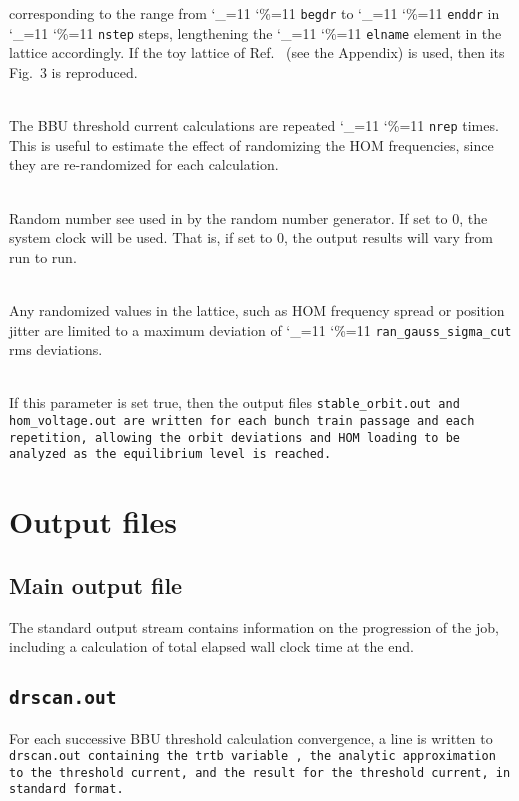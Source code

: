 \documentclass[11pt]{article}
\newcommand\ttcmd{\begingroup\catcode`\_=11 \catcode`\%=11 \dottcmd}
\newcommand\dottcmd[1]{\texttt{#1}\endgroup}
\newcommand{\vn}{\ttcmd}
\newcommand{\Newline}{\hfil \\}
\begin{document}
{\begin{description}
corresponding to the range from \vn{begdr} to \vn{enddr} in  \vn{nstep} steps,
lengthening the \vn{elname} element in the lattice accordingly. If the toy lattice
of Ref.~\cite{ref:Hoffstaetter04} (see the Appendix) is used, then its Fig.~3 is reproduced.
  \item[\vn{nrep}] \Newline
The BBU threshold current calculations are repeated \vn{nrep} times. This is useful
to estimate the effect of randomizing the HOM frequencies, since they are re-randomized for
each calculation.
  \item[\vn{ran_seed}] \Newline
Random number see used in by the random number generator. If set to 0, the system clock
will be used. That is, if set to 0, the output results will vary from run to run. 
  \item[\vn{ran_gauss_sigma_cut}] \Newline
Any randomized values in the lattice, such as HOM frequency spread or position jitter
are limited to a maximum deviation of \vn{ran_gauss_sigma_cut} rms deviations. 
  \item[\vn{stable_orbit_anal}] \Newline
If this parameter is set true, then the output files \tt{stable_orbit.out} and \tt{hom_voltage.out}
are written for each bunch train passage and each repetition, allowing the orbit deviations
and HOM loading to be analyzed as the equilibrium level is reached.

\end{description}
\section{Output files} 

\subsection{Main output file}
The standard output stream contains information on the progression of the job,
including a calculation of total elapsed wall clock time at the end.
\subsection{\tt{drscan.out}}
For each successive BBU threshold calculation convergence, a line is written
to \tt{drscan.out} containing the {tr\/tb} variable~\cite{ref:Hoffstaetter04},
the analytic approximation to the threshold current, and the result for the
threshold current, in standard format.
}
\end{document}
